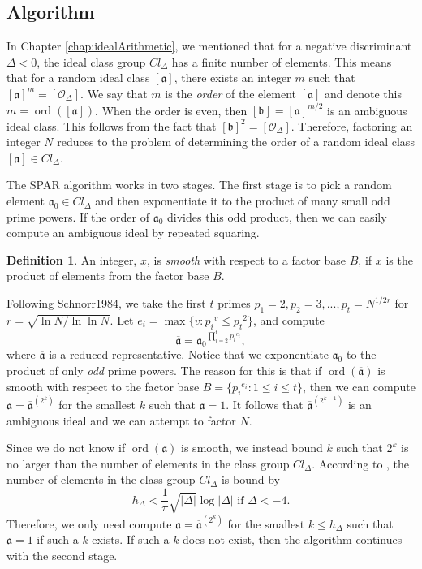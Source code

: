 \documentclass{ucalgthes1}
\theoremstyle{plain}
\theoremstyle{definition}
\newtheorem{defn}[thm]{Definition}
\DeclareMathOperator{\ord}{ord}
\begin{document}
\subsection{Algorithm}

In Chapter \ref{chap:idealArithmetic}, we mentioned that for a negative discriminant $\Delta < 0$, the ideal class group $Cl_\Delta$ has a finite number of elements.  This means that for a random ideal class $[\mathfrak a]$, there exists an integer $m$ such that ${[\mathfrak a]}^m = [\mathcal O_\Delta]$. We say that $m$ is the \emph{order} of the element $[\mathfrak a]$ and denote this $m = \ord([\mathfrak a])$.  When the order is even, then $[\mathfrak b] = {[\mathfrak a]}^{m/2}$ is an ambiguous ideal class.  This follows from the fact that ${[\mathfrak b]}^2 = [\mathcal O_\Delta]$.  Therefore, factoring an integer $N$ reduces to the problem of determining the order of a random ideal class $[\mathfrak a] \in Cl_\Delta$.

The SPAR algorithm works in two stages. The first stage is to pick a random element $\mathfrak a_0 \in Cl_\Delta$ and then exponentiate it to the product of many small odd prime powers.  If the order of $\mathfrak a_0$ divides this odd product, then we can easily compute an ambiguous ideal by repeated squaring.

\begin{defn}
An integer, $x$, is \emph{smooth} with respect to a factor base $B$, if $x$ is the product of elements from the factor base $B$.
\end{defn}

\newcommand{\abar}{\overline{\mathfrak a}}
\newcommand{\ahat}{\hat{\mathfrak a}}

Following {Schnorr1984}, we take the first $t$ primes $p_1 = 2, p_2 = 3, ..., p_t = N^{1/2r}$ for $r = \sqrt{\ln N / \ln \ln N}$.  Let $e_i = \max \{ v : {p_i}^v \le {p_t}^2 \}$, and compute
\[
	\abar = {\mathfrak a_0}^{\prod_{i=2}^t {p_i}^{e_i}},
\]
where $\abar$ is a reduced representative. Notice that we exponentiate $\mathfrak a_0$ to the product of only \emph{odd} prime powers.  The reason for this is that if $\ord(\abar)$ is smooth with respect to the factor base $B = \{{p_i}^{e_i} : 1 \le i \le t\}$, then we can compute $\mathfrak a = {\abar}^{\left(2^k\right)}$ for the smallest $k$ such that $\mathfrak a = 1$.  It follows that ${\abar}^{\left(2^{k-1}\right)}$ is an ambiguous ideal and we can attempt to factor $N$.

Since we do not know if $\ord(\mathfrak a)$ is smooth, we instead bound $k$ such that $2^k$ is no larger than the number of elements in the class group $Cl_\Delta$.  According to \cite[p.155]{Jacobson2009}, the number of elements in the class group $Cl_\Delta$ is bound by
\[
	h_\Delta < \frac{1}{\pi} \sqrt{|\Delta|}\log{|\Delta|} \textrm{ if } \Delta < -4.
\]
Therefore, we only need compute $\mathfrak a = \abar^{\left(2^k\right)}$ for the smallest $k \le h_\Delta$ such that $\mathfrak a = 1$ if such a $k$ exists. If such a $k$ does not exist, then the algorithm continues with the second stage.
\end{document}
